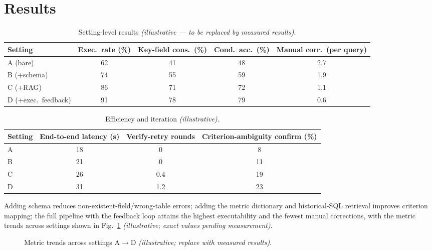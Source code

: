 \documentclass[11pt]{article}
\begin{document}
\section{Results}
\begin{table}[t]\centering
\caption{Setting-level results \textit{(illustrative — to be replaced by measured results)}.}
\label{tab:main}
\begin{tabular}{lcccc}
\toprule
Setting & Exec.\ rate (\%) & Key-field cons.\ (\%) & Cond.\ acc.\ (\%) & Manual corr.\ (per query)\\
\midrule
A (bare)            & 62 & 41 & 48 & 2.7\\
B (+schema)         & 74 & 55 & 59 & 1.9\\
C (+RAG)            & 86 & 71 & 72 & 1.1\\
D (+exec.\ feedback)& 91 & 78 & 79 & 0.6\\
\bottomrule
\end{tabular}
\end{table}

\begin{table}[t]\centering
\caption{Efficiency and iteration \textit{(illustrative)}.}\label{tab:eff}
\begin{tabular}{lccc}
\toprule
Setting & End-to-end latency (s) & Verify-retry rounds & Criterion-ambiguity confirm (\%)\\
\midrule
A & 18 & 0   & 8\\
B & 21 & 0   & 11\\
C & 26 & 0.4 & 19\\
D & 31 & 1.2 & 23\\
\bottomrule
\end{tabular}
\end{table}

Adding schema reduces non-existent-field/wrong-table errors; adding the metric dictionary and
historical-SQL retrieval improves criterion mapping; the full pipeline with the feedback loop
attains the highest executability and the fewest manual corrections, with the metric trends across
settings shown in Fig.~\ref{fig:results} \emph{(illustrative; exact values pending measurement)}.

\begin{figure}[t]\centering
{}
\caption{Metric trends across settings A$\to$D \textit{(illustrative; replace with measured
results)}.}\label{fig:results}
\end{figure}
\end{document}
